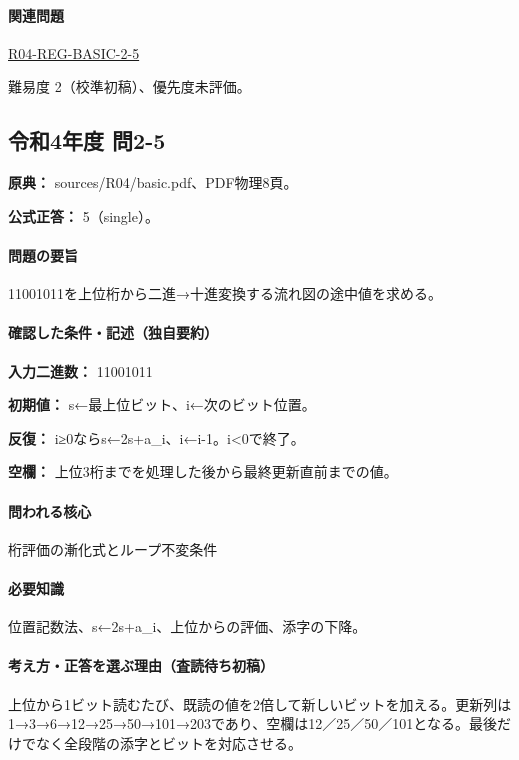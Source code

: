 \paragraph{関連問題} \hyperref[q:r04-reg-basic-2-5]{R04-REG-BASIC-2-5}

\par 難易度 2（校準初稿）、優先度未評価。

\subsection{令和4年度 問2-5}
\label{q:r04-reg-basic-2-5}

\noindent\textbf{原典：} sources/R04/basic.pdf、PDF物理8頁。

\textbf{公式正答：} 5（single）。

\paragraph{問題の要旨} 11001011を上位桁から二進→十進変換する流れ図の途中値を求める。

\paragraph{確認した条件・記述（独自要約）}\mbox{}\par

\noindent\textbf{入力二進数：} 11001011\par

\noindent\textbf{初期値：} s←最上位ビット、i←次のビット位置。\par

\noindent\textbf{反復：} i≥0ならs←2s+a\_i、i←i-1。i<0で終了。\par

\noindent\textbf{空欄：} 上位3桁までを処理した後から最終更新直前までの値。\par

\paragraph{問われる核心} 桁評価の漸化式とループ不変条件

\paragraph{必要知識} 位置記数法、s←2s+a\_i、上位からの評価、添字の下降。

\paragraph{考え方・正答を選ぶ理由（査読待ち初稿）} 上位から1ビット読むたび、既読の値を2倍して新しいビットを加える。更新列は1→3→6→12→25→50→101→203であり、空欄は12／25／50／101となる。最後だけでなく全段階の添字とビットを対応させる。

